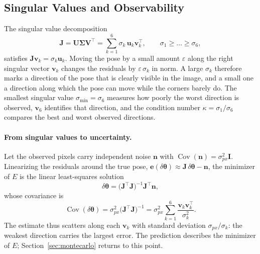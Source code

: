\documentclass[11pt,a4paper]{article}
\theoremstyle{definition}
\theoremstyle{plain}
\theoremstyle{remark}
\begin{document}
\subsection{Singular Values and Observability}
\label{sec:svd}

The singular value decomposition
\begin{equation}
  \mathbf{J} = \mathbf{U}\boldsymbol{\Sigma}\mathbf{V}^\top
  = \sum_{k=1}^{6}\sigma_k\,\mathbf{u}_k\mathbf{v}_k^\top,
  \qquad \sigma_1\ge\dots\ge\sigma_6,
\end{equation}
satisfies $\mathbf{J}\mathbf{v}_k = \sigma_k\mathbf{u}_k$. Moving the pose by a
small amount $\varepsilon$ along the right singular vector $\mathbf{v}_k$
changes the residuals by $\varepsilon\,\sigma_k$ in norm. A large $\sigma_k$
therefore marks a direction of the pose that is clearly visible in the image,
and a small one a direction along which the pose can move while the corners
barely do. The smallest singular value $\sigma_{\min} = \sigma_6$ measures how
poorly the worst direction is observed, $\mathbf{v}_6$ identifies that
direction, and the condition number $\kappa = \sigma_1/\sigma_6$ compares the
best and worst observed directions.

\paragraph{From singular values to uncertainty.} Let the observed pixels carry
independent noise $\mathbf{n}$ with $\operatorname{Cov}(\mathbf{n}) =
\sigma_{px}^2\mathbf{I}$. Linearizing the residuals around the true pose,
$\mathbf{e}(\delta\boldsymbol{\theta}) \approx \mathbf{J}\,\delta\boldsymbol{\theta}
- \mathbf{n}$, the minimizer of $E$ is the linear least-squares solution
\begin{equation}
  \delta\boldsymbol{\theta}
  = \big(\mathbf{J}^\top\mathbf{J}\big)^{-1}\mathbf{J}^\top\mathbf{n},
  \label{eq:gn-at-truth}
\end{equation}
whose covariance is
\begin{equation}
  \boxed{\quad
  \operatorname{Cov}(\delta\boldsymbol{\theta})
  = \sigma_{px}^2\big(\mathbf{J}^\top\mathbf{J}\big)^{-1}
  = \sigma_{px}^2\sum_{k=1}^{6}\frac{\mathbf{v}_k\mathbf{v}_k^\top}{\sigma_k^2}.
  \quad}
  \label{eq:covariance}
\end{equation}
The estimate thus scatters along each $\mathbf{v}_k$ with standard deviation
$\sigma_{px}/\sigma_k$: the weakest direction carries the largest error. The
prediction describes the minimizer of $E$; Section~\ref{sec:montecarlo} returns
to this point.
\end{document}
